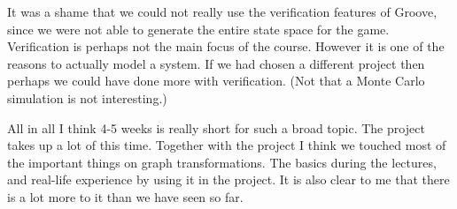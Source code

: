 It was a shame that we could not really use the verification features of Groove, since we were not able to generate the entire state space for the game.
Verification is perhaps not the main focus of the course. However it is one of the reasons to actually model a system.
If we had chosen a different project then perhaps we could have done more with verification. (Not that a Monte Carlo simulation is not interesting.)

All in all I think 4-5 weeks is really short for such a broad topic. The project takes up a lot of this time. 
Together with the project I think we touched most of the important things on graph transformations. The basics during the lectures, and real-life experience by using it in the project.
It is also clear to me that there is a lot more to it than we have seen so far.
